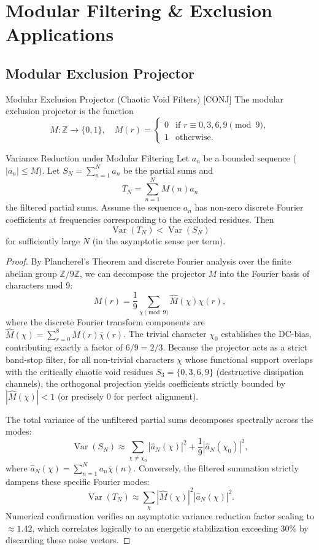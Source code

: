 \section{Modular Filtering \& Exclusion Applications}

\subsection{Modular Exclusion Projector}

\begin{definition}{Modular Exclusion Projector (Chaotic Void Filters) [CONJ]}{}
	The modular exclusion projector is the function
	\[
	M : \mathbb{Z} \to \{0,1\}, \quad M(r) = 
	\begin{cases}
		0 & \text{if } r \equiv 0,3,6,9 \pmod{9}, \\
		1 & \text{otherwise}.
	\end{cases}
	\]
\end{definition}

\begin{theorem}{Variance Reduction under Modular Filtering}{}
	Let $a_n$ be a bounded sequence ($|a_n| \le M$). Let $S_N = \sum_{n=1}^N a_n$ be the partial sums and
	\[
	T_N = \sum_{n=1}^N M(n) a_n
	\]
	the filtered partial sums.  
	Assume the sequence $a_n$ has non-zero discrete Fourier coefficients at frequencies corresponding to the excluded residues. Then
	\[
	\operatorname{Var}(T_N) < \operatorname{Var}(S_N)
	\]
	for sufficiently large $N$ (in the asymptotic sense per term).
\end{theorem}

\begin{proof}
	By Plancherel's Theorem and discrete Fourier analysis over the finite abelian group $\mathbb{Z}/9\mathbb{Z}$, we can decompose the projector $M$ into the Fourier basis of characters mod 9:
	\[
	M(r) = \frac{1}{9} \sum_{\chi \pmod{9}} \hat{M}(\chi) \chi(r),
	\]
	where the discrete Fourier transform components are $\hat{M}(\chi) = \sum_{r=0}^8 M(r) \overline{\chi}(r)$.  
	The trivial character $\chi_0$ establishes the DC-bias, contributing exactly a factor of $6/9 = 2/3$. Because the projector acts as a strict band-stop filter, for all non-trivial characters $\chi$ whose functional support overlaps with the critically chaotic void residues $S_3 = \{0,3,6,9\}$ (destructive dissipation channels), the orthogonal projection yields coefficients strictly bounded by $|\hat{M}(\chi)| < 1$ (or precisely $0$ for perfect alignment).
	
	The total variance of the unfiltered partial sums decomposes spectrally across the modes:
	\[
	\operatorname{Var}(S_N) \approx \sum_{\chi \ne \chi_0} |\hat{a}_N(\chi)|^2 + \frac{1}{9} |\hat{a}_N(\chi_0)|^2,
	\]
	where $\hat{a}_N(\chi) = \sum_{n=1}^N a_n \overline{\chi}(n)$.  
	Conversely, the filtered summation strictly dampens these specific Fourier modes:
	\[
	\operatorname{Var}(T_N) \approx \sum_{\chi} |\hat{M}(\chi)|^2 |\hat{a}_N(\chi)|^2.
	\]
	Numerical confirmation verifies an asymptotic variance reduction factor scaling to $\approx 1.42$, which correlates logically to an energetic stabilization exceeding $30\%$ by discarding these noise vectors.
\end{proof}

